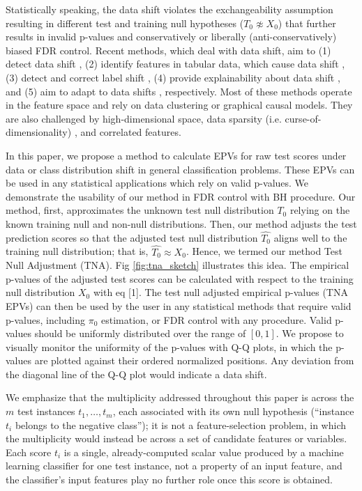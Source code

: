 \documentclass[10pt,letterpaper]{article}
\begin{document}
Statistically speaking, the data shift violates the exchangeability assumption resulting in different test and training null hypotheses ($T_0 \not\approx X_0$) that further results in invalid p-values and conservatively or liberally (anti-conservatively) biased FDR control. 
Recent methods, which deal with data shift, aim to (1) detect data shift  \cite{ dasu2009change}, (2) identify features in tabular data, which cause data shift \cite{kulinski2020feature}, (3) detect and correct label shift \cite{lipton2018detecting}, (4) provide explainability about data shift \cite{budhathoki2021did,kulinski2023towards}, and (5) aim to adapt to data shifts \cite{sui2024unleashing, zhang2021adaptive, zhang2022memo}, respectively.
Most of these methods operate in the feature space and rely on data clustering or graphical causal models.
They are also challenged by high-dimensional space, data sparsity (i.e. curse-of-dimensionality) \cite{donoho2000high}, and correlated features. 


In this paper, we propose a method to calculate EPVs for raw test scores under data or class distribution shift in general classification problems.
These EPVs can be used in any statistical applications which rely on valid p-values.
We demonstrate the usability of our method in FDR control with BH procedure.
Our method, first, approximates the unknown test null distribution $T_0$ relying on the known training null and non-null distributions.
Then, our method adjusts the test prediction scores so that the adjusted test null distribution $\hat{T_0}$ aligns well to the training null distribution; that is, $\hat{T_0}\approx X_0$.
Hence, we termed our method Test Null Adjustment (TNA).
Fig \ref{fig:tna_sketch} illustrates this idea.
The empirical p-values of the adjusted test scores can be calculated with respect to the training null distribution $X_0$ with eq [1].
The test null adjusted empirical p-values (TNA EPVs) can then be used by the user in any statistical methods that require valid p-values, including $\pi_0$ estimation, or FDR control with any procedure.
Valid p-values should be uniformly distributed over the range of $[0,1]$.
We propose to visually monitor the uniformity of the p-values with Q-Q plots, in which the p-values are plotted against their ordered normalized positions.
Any deviation from the diagonal line of the Q-Q plot would indicate a data shift.

We emphasize that the multiplicity addressed throughout this paper is across the $m$ test instances $t_1,\dots,t_m$, each associated with its own null hypothesis (``instance $t_i$ belongs to the negative class''); it is not a feature-selection problem, in which the multiplicity would instead be across a set of candidate features or variables. Each score $t_i$ is a single, already-computed scalar value produced by a machine learning classifier for one test instance, not a property of an input feature, and the classifier's input features play no further role once this score is obtained.
\end{document}
